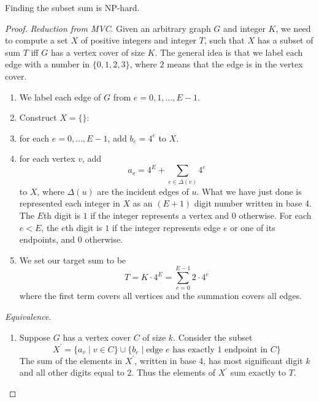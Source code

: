   \begin{theorem}
    Finding the subset sum is NP-hard. 
  \end{theorem}
  \begin{proof}
    \textit{Reduction from MVC}. Given an arbitrary graph $G$ and integer $K$, we need to compute a set $X$ of positive integers and integer $T$, such that $X$ has a subset of sum $T$ iff $G$ has a vertex cover of size $K$. The general idea is that we label each edge with a number in $\{0, 1, 2, 3\}$, where $2$ means that the edge is in the vertex cover. 
    \begin{enumerate}
      \item We label each edge of $G$ from $e = 0, 1, \ldots, E-1$. 
      \item Construct $X = \{\}$: 
      \item for each $e = 0, \ldots, E-1$, add $b_e = 4^e$ to $X$. 
      \item for each vertex $v$, add 
      \begin{equation}
        a_v = 4^{E} + \sum_{e \in \Delta(v)} 4^e
      \end{equation}
      to $X$, where $\Delta(u)$ are the incident edges of $u$. What we have just done is represented each integer in $X$ as an $(E + 1)$ digit number written in base 4. The $E$th digit is $1$ if the integer represents a vertex and $0$ otherwise. For each $e < E$, the $e$th digit is $1$ if the integer represents edge $e$ or one of its endpoints, and $0$ otherwise. 

      \item We set our target sum to be 
      \begin{equation}
        T = K \cdot 4^E = \sum_{e=0}^{E-1} 2 \cdot 4^e
      \end{equation}
      where the first term covers all vertices and the summation covers all edges. 
    \end{enumerate}

    \textit{Equivalence}. 
    \begin{enumerate}
      \item Suppose $G$ has a vertex cover $C$ of size $k$. Consider the subset 
      \begin{equation}
        X^\prime = \{a_v \mid v \in C\} \cup \{b_e \mid \text{edge } e \text{ has exactly 1 endpoint in } C\} 
      \end{equation}
      The sum of the elements in $X^\prime$, written in base 4, has most significant digit $k$ and all other digits equal to $2$. Thus the elements of $X^\prime$ sum exactly to $T$. 


\end{enumerate}
\end{proof}
